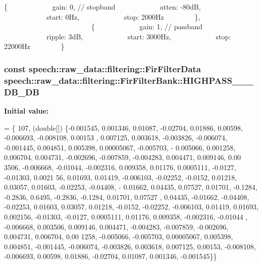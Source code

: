 \{             gain\+: 0, // stopband             atten\+: -\/80d\+B,             start\+: 0\+Hz,             stop\+: 2000\+Hz         \},                          \{             gain\+: 1, // passband             ripple\+: 3d\+B,             start\+: 3000\+Hz,             stop\+: 22000\+Hz         \} \hypertarget{classspeech_1_1raw__data_1_1filtering_1_1FirFilterBank_ab62552f4111d615c675582de6378e462}{
\subsubsection[{H\+I\+G\+H\+P\+A\+S\+S\+\_\+44100\+\_\+8000\+\_\+3\+D\+B\+\_\+80\+D\+B}]{\setlength{\rightskip}{0pt plus 5cm}const {\bf speech\+::raw\+\_\+data\+::filtering\+::\+Fir\+Filter\+Data} speech\+::raw\+\_\+data\+::filtering\+::\+Fir\+Filter\+Bank\+::\+H\+I\+G\+H\+P\+A\+S\+S\+\_\+\_\+\_\+D\+B\+\_\+D\+B\hspace{0.3cm}{\ttfamily [static]}}}\label{classspeech_1_1raw__data_1_1filtering_1_1FirFilterBank_ab62552f4111d615c675582de6378e462}
{\bfseries Initial value\+:}
\begin{DoxyCode}
= \{
        107,
        (\textcolor{keywordtype}{double}[]) \{-0.001545, 0.001346, 0.01087, -0.02704, 0.01886, 0.00598, -0.006693, -0.008108, 0.00153
      , 0.007125,
                    0.003618, -0.003826, -0.006074, -0.001445, 0.004851, 0.005398, 0.00005067, -0.005703, -
      0.005066,
                    0.001258, 0.006704, 0.004731, -0.002696, -0.007859, -0.004283, 0.004471, 0.009146, 0.00
      3506,
                    -0.006668, -0.01044, -0.002316, 0.009358, 0.01176, 0.0005111, -0.0127, -0.01303, 0.0021
      56, 0.01693,
                    0.01419, -0.006103, -0.02252, -0.0152, 0.01218, 0.03057, 0.01603, -0.02253, -0.04408, -
      0.01662,
                    0.04435, 0.07527, 0.01701, -0.1284, -0.2836, 0.6495, -0.2836, -0.1284, 0.01701, 0.07527
      , 0.04435,
                    -0.01662, -0.04408, -0.02253, 0.01603, 0.03057, 0.01218, -0.0152, -0.02252, -0.006103, 
      0.01419,
                    0.01693, 0.002156, -0.01303, -0.0127, 0.0005111, 0.01176, 0.009358, -0.002316, -0.01044
      , -0.006668,
                    0.003506, 0.009146, 0.004471, -0.004283, -0.007859, -0.002696, 0.004731, 0.006704, 0.00
      1258,
                    -0.005066, -0.005703, 0.00005067, 0.005398, 0.004851, -0.001445, -0.006074, -0.003826, 
      0.003618,
                    0.007125, 0.00153, -0.008108, -0.006693, 0.00598, 0.01886, -0.02704, 0.01087, 0.001346,
       -0.001545\}\}
\end{DoxyCode}

